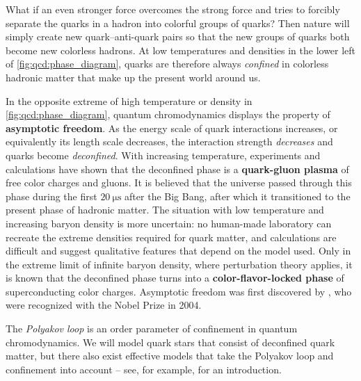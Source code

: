 What if an even stronger force overcomes the strong force and tries to forcibly separate the quarks in a hadron into colorful groups of quarks?
Then nature will simply create new quark--anti-quark pairs so that the new groups of quarks both become new colorless hadrons.
At low temperatures and densities in the lower left of \cref{fig:qcd:phase_diagram}, quarks are therefore always \emph{confined}
in colorless hadronic matter that make up the present world around us.

In the opposite extreme of high temperature or density in \cref{fig:qcd:phase_diagram}, quantum chromodynamics displays the property of \textbf{asymptotic freedom}.
As the energy scale of quark interactions increases, or equivalently its length scale decreases, the interaction strength \emph{decreases} and quarks become \emph{deconfined}.
With increasing temperature, experiments and calculations have shown that the deconfined phase is a \textbf{quark-gluon plasma} of free color charges and gluons.
It is believed that the universe passed through this phase during the first $\SI{20}{\micro\second}$ after the Big Bang, after which it transitioned to the present phase of hadronic matter.
The situation with low temperature and increasing baryon density is more uncertain:
no human-made laboratory can recreate the extreme densities required for quark matter,
and calculations are difficult and suggest qualitative features that depend on the model used.
Only in the extreme limit of infinite baryon density, where perturbation theory applies,
it is known that the deconfined phase turns into a \textbf{color-flavor-locked phase} of superconducting color charges.
Asymptotic freedom was first discovered by \cite{ref:asymptotic_freedom_gross_wilczek,ref:asymptotic_freedom_politzer}, who were recognized with the Nobel Prize in 2004.

The \emph{Polyakov loop} is an order parameter of confinement in quantum chromodynamics.
We will model quark stars that consist of deconfined quark matter,
but there also exist effective models that take the Polyakov loop and confinement into account
-- see, for example, \cite{ref:master_folkestad} for an introduction.


